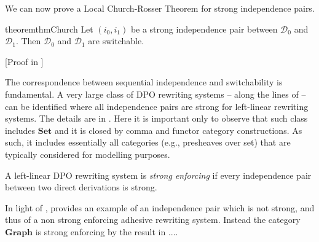 \documentclass[a4paper,UKenglish,cleveref,pdftex,thm-restate,numberwithinsect,anonymous]{lipics}
\newcommand{\cat}[1]{\ensuremath{\mathbf{#1}}}
\newcommand{\dder}[1]{\mathscr{#1}}
\newcommand{\rem}[2]{{\color{blue}#1}{\color{red}#2}}
\renewcommand{\rem}[2]{}
\begin{document}


We can now prove a Local Church-Rosser Theorem for strong independence pairs.


\begin{restatable}{theorem}{thmChurch}
  \label{thm:church}
  Let $(i_0, i_1)$ be a strong independence pair
  between $\dder{D}_0$ and $\dder{D}_1$. Then $\dder{D}_0$ and
  $\dder{D}_1$ are switchable.
\end{restatable}
[Proof in ]

The correspondence between sequential independence and switchability
is fundamental.  A very large class of DPO rewriting systems -- along the
lines of \cite{baldan2011adhesivity} -- can be identified where all
independence pairs are strong for left-linear rewriting systems. The details are in 
. Here it is important only to observe that such class includes $\cat{Set}$ and it is closed by comma and functor category constructions. 
As such, it includes essentially all categories (e.g., presheaves over set) that are typically considered for modelling purposes.



\begin{definition}A left-linear DPO rewriting system is \emph{strong enforcing} if every independence pair between two direct derivations is strong. 
\end{definition}

\begin{example}
  \label{ex:diff2}
  In light of ,  provides an example
  of an independence pair which is not strong, and thus of a non strong enforcing
  adhesive rewriting system. Instead the category $\cat{Graph}$ is
  strong enforcing by the result in .... 
\end{example}
\end{document}
